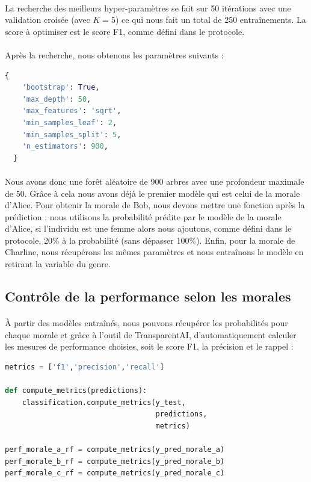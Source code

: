 \documentclass[10pt, french, a4paper]{report}
\begin{document}
\paragraph{}
La recherche des meilleurs hyper-paramètres se fait sur 50 itérations avec une validation croisée (avec $K=5$) ce qui nous fait un total de 250 entraînements. La score à optimiser est le score F1, comme défini dans le protocole. 

\paragraph{}
Après la recherche, nous obtenons les paramètres suivants : 

\begin{lstlisting}[language=python]
  {
    'bootstrap': True,
    'max_depth': 50,
    'max_features': 'sqrt',
    'min_samples_leaf': 2,
    'min_samples_split': 5,
    'n_estimators': 900,
  }
\end{lstlisting}

\paragraph{}
Nous avons donc une forêt aléatoire de 900 arbres avec une profondeur maximale de 50. Grâce à cela nous avons déjà le premier modèle qui est celui de la morale d'Alice. Pour obtenir la morale de Bob, nous devons mettre une fonction après la prédiction : nous utilisons la probabilité prédite par le modèle de la morale d'Alice, si l'individu est une femme alors nous ajoutons, comme défini dans le protocole, 20\% à la probabilité (sans dépasser 100\%). Enfin, pour la morale de Charline, nous récupérons les mêmes paramètres et nous entraînons le modèle en retirant la variable du genre.

\subsection{Contrôle de la performance selon les morales}

\paragraph{}
À partir des modèles entraînés, nous pouvons récupérer les probabilités pour chaque morale et grâce à l'outil de TransparentAI, d'automatiquement calculer les mesures de performance choisies, soit le score F1, la précision et le rappel :


\begin{lstlisting}[language=python]
metrics = ['f1','precision','recall']

def compute_metrics(predictions):
    classification.compute_metrics(y_test, 
                                   predictions, 
                                   metrics)

perf_morale_a_rf = compute_metrics(y_pred_morale_a)
perf_morale_b_rf = compute_metrics(y_pred_morale_b)
perf_morale_c_rf = compute_metrics(y_pred_morale_c)
\end{lstlisting}
\end{document}
